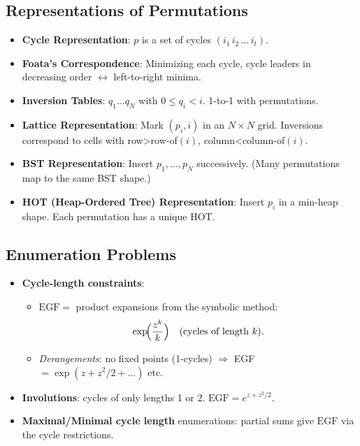 \documentclass[11pt,letterpaper]{article}
\begin{document}
\subsection{Representations of Permutations}
\begin{itemize}
  \item \textbf{Cycle Representation}: $p$ is a set of cycles $(i_1\,i_2\,\dots\,i_t)$.
  \item \textbf{Foata's Correspondence}: Minimizing each cycle, cycle leaders in decreasing order $\leftrightarrow$ left-to-right minima.
  \item \textbf{Inversion Tables}: $q_1 \dots q_N$ with $0 \le q_i < i$. 1-to-1 with permutations.
  \item \textbf{Lattice Representation}: Mark $(p_i,i)$ in an $N\times N$ grid. Inversions correspond to cells with row>row-of$(i)$, column<column-of$(i)$.
  \item \textbf{BST Representation}: Insert $p_1,\dots,p_N$ successively. (Many permutations map to the same BST shape.)
  \item \textbf{HOT (Heap-Ordered Tree) Representation}: Insert $p_i$ in a min-heap shape. Each permutation has a unique HOT.
\end{itemize}

\subsection{Enumeration Problems}
\begin{itemize}
  \item \textbf{Cycle-length constraints}: 
    \begin{itemize}
      \item $\mathrm{EGF}=$ product expansions from the symbolic method: 
        \[
          \exp\!\Bigl(\frac{z^k}{k}\Bigr) \quad\text{(cycles of length }k\text{)}.
        \]
      \item \emph{Derangements}: no fixed points (1-cycles) $\Rightarrow$ EGF $= \exp(z+z^2/2 +\dots)$ etc.
    \end{itemize}
  \item \textbf{Involutions}: cycles of only lengths 1 or 2. $\mathrm{EGF}= e^{z + z^2/2}$. 
  \item \textbf{Maximal/Minimal cycle length} enumerations: partial sums give $\mathrm{EGF}$ via the cycle restrictions. 
\end{itemize}
\end{document}
